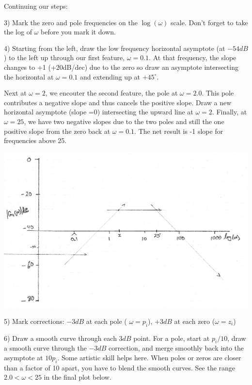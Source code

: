 \begin{ExampleCont}
\noindent
Continuing our steps:

3) Mark the zero and pole frequencies on the $\log(\omega)$ scale.   Don't forget to take the log of $\omega$ before you mark it down.

4) Starting from the left, draw the low frequency horizontal asymptote (at $-54dB$) to the left up through our first feature, $\omega = 0.1$.  At that frequency, the slope changes to +1 (+20dB/dec) due to the zero so draw an asymptote intersecting the horizontal at $\omega=0.1$ and extending up at $+45^\circ$.

Next at $\omega=2$, we encouter the second feature, the pole at $\omega=2.0$. This pole contributes a negative slope and thus cancels the positive slope.  Draw a new horizontal asymptote (slope =0) intersecting the upward line at $\omega=2$.   Finally, at $\omega = 25$, we have two negative slopes due to the two poles and still the one positive slope from the zero back at $\omega = 0.1$.  The net result is -1 slope for frequencies above 25.

\includegraphics[width=6.5in]{figs05/00738a.png}

5) Mark corrections:   $-3dB$ at each pole ( $\omega = p_i$),   $+3dB$ at  each zero ($\omega=z_i$)

6) Draw a smooth curve through each $3dB$ point.  For a pole, start at $p_i/10$, draw a smooth curve through the $-3dB$ correction, and merge smoothly back into the asymptote at $10p_i$.   Some artistic skill helps here.  When poles or zeros are closer than a factor of 10 apart, you have to blend the smooth curves.  See the range $2.0 < \omega < 25$ in the final plot below.
\end{ExampleCont}


